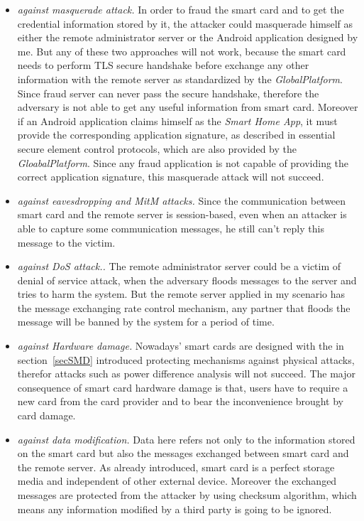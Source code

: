 \begin{itemize}
\item \emph{against masquerade attack.} In order to fraud the smart card and to get the credential information stored by it, the attacker could masquerade  himself as either the remote administrator server or the Android application designed by me.  But any of these two approaches will not work, because the smart card needs to perform TLS secure handshake before exchange any other information with the remote server as standardized by the \emph{GlobalPlatform}. Since fraud server can never pass the secure handshake, therefore the adversary is not able to get any useful information from smart card. Moreover if an Android application claims himself as the \emph{Smart Home App}, it must provide the corresponding application signature, as described in essential secure element  control protocols, which are also provided by the \emph{GloabalPlatform}. Since any fraud application is not capable of providing the correct application signature, this masquerade attack will not succeed. 
\item \emph{against eavesdropping and MitM attacks.} Since the communication between smart card and the remote server is session-based, even when an attacker is able to capture some communication messages, he still can't reply this message to the victim. 
\item \emph{against DoS attack..} The remote administrator server could be a victim of denial of service attack, when the adversary floods messages to the server and tries to harm the system. But the remote server applied in my scenario has the message exchanging rate control  mechanism, any partner that floods the message will be banned by the system for a period of time.
\item \emph{against Hardware damage.} Nowadays' smart cards are designed with the in section~\ref{secSMD} introduced protecting mechanisms against physical attacks, therefor attacks such as power difference analysis will not succeed. The major consequence of smart card hardware damage is that, users have to require a new card from the card provider and to bear the inconvenience brought by card damage. 
\item \emph{against data modification.} Data here refers not only to the information stored on the smart card but also the messages exchanged between smart card and the remote server.  As already introduced, smart card is a perfect storage media and independent of other external device. Moreover the exchanged messages are protected from the attacker by using checksum algorithm, which means any information modified by a third party is going to be ignored.
\end{itemize}

